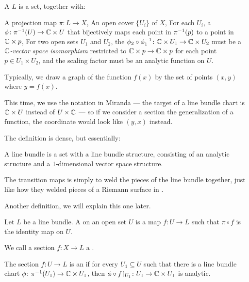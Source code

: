\begin{definition}
	A  $L$ is a set, together with:
	\begin{itemize}
		\ii A projection map $\pi \colon L \to X$,
		\ii An open cover $\{ U_i \}$ of $X$,
		\ii For each $U_i$, a  $\phi \colon \pi^{-1}(U) \to \mathbb C \times U$
		that bijectively maps each point in $\pi^{-1}(p)$ to a point in $\mathbb C \times p$,
		\ii For two open sets $U_1$ and $U_2$, the  $\phi_2 \circ
		\phi_1^{-1} \colon \mathbb C \times U_1 \to \mathbb C \times U_2$ must be a \emph{$\mathbb C$-vector space
		isomorphism} restricted to $\mathbb C \times p \to \mathbb C \times p$ for each point $p \in U_1 \times
		U_2$, and the scaling factor must be an analytic function on $U$.
	\end{itemize}
\end{definition}

\begin{remark}[Warning]
	Typically, we draw a graph of the function $f(x)$ by the set of points $(x, y)$ where $y =
	f(x)$.

	This time, we use the notation in Miranda --- the target of a line bundle chart is $\mathbb C \times U$
	instead of $U \times \mathbb C$ --- so if we consider a section the generalization of a function, the
	coordinate would look like $(y, x)$ instead.
\end{remark}

The definition is dense, but essentially:
\begin{moral}
	A line bundle is a set with a line bundle structure, consisting of an analytic structure and a
	$1$-dimensional vector space structure.
\end{moral}
The transition maps is simply to weld the pieces of the line bundle together, just like how they
welded pieces of a Riemann surface in .

Another definition, we will explain this one later.
\begin{definition}
	Let $L$ be a line bundle. A  on an open set $U$
	is a map $f \colon U \to L$ such that $\pi \circ f$ is
	the identity map on $U$.

	We call a section $f \colon X \to L$ a .

	The section $f \colon U \to L$ is an  if for every $U_1 \subseteq U$
	such that there is a line bundle chart $\phi \colon \pi^{-1}(U_1) \to \mathbb C \times U_1$, then
	$\phi \circ f\restrict{U_1} \colon U_1 \to \CC \times U_1$ is analytic.
\end{definition}

